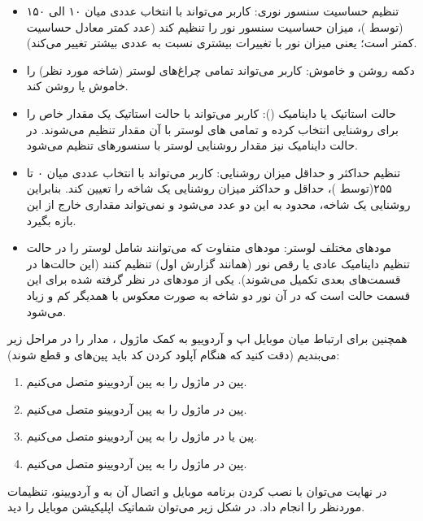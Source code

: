 \documentclass[12pt,a4paper]{article}
\begin{document}
\begin{itemize}
	\item 
{تنظیم حساسیت سنسور نوری:} کاربر می‌تواند با انتخاب عددی میان ۱۰ الی ۱۵۰ (توسط )، میزان حساسیت سنسور نور را تنظیم کند (عدد کمتر معادل حساسیت کمتر است؛ یعنی میزان نور با تغییرات بیشتری نسبت به عددی بیشتر تغییر می‌کند).
	\item 
{دکمه روشن و خاموش:} کاربر می‌تواند تمامی چراغ‌های لوستر (شاخه مورد نظر) را خاموش یا روشن کند.
	\item 
{حالت استاتیک یا داینامیک ():} کاربر می‌تواند با حالت استاتیک یک مقدار خاص را برای روشنایی انتخاب کرده و تمامی  های لوستر با آن مقدار تنظیم می‌شوند. در حالت داینامیک نیز مقدار روشنایی لوستر با سنسورهای تنظیم می‌شود.
	\item 
{تنظیم حداکثر و حداقل میزان روشنایی:} کاربر می‌تواند با انتخاب عددی میان ۰ تا ۲۵۵(توسط )، حداقل و حداکثر میزان روشنایی یک شاخه را تعیین کند. بنابراین روشنایی یک شاخه، محدود به این دو عدد می‌شود و نمی‌تواند مقداری خارج از این بازه بگیرد.
	\item 
{مودهای مختلف لوستر:} مودهای متفاوت که می‌توانند شامل لوستر را در حالت تنظیم داینامیک عادی یا رقص نور (همانند گزارش اول) تنظیم کنند (این حالت‌ها در قسمت‌های بعدی تکمیل می‌شوند). یکی از مودهای در نظر گرفته شده برای این قسمت حالت  است که در آن نور دو شاخه به صورت معکوس با همدیگر کم و زیاد می‌شود.

\end{itemize}
همچنین برای ارتباط میان موبایل اپ و آردوییو به کمک ماژول ، مدار را در مراحل زیر می‌بندیم (دقت کنید که هنگام آپلود کردن کد باید پین‌های  و  قطع شوند):
\begin{enumerate}
	\item
	پین  در ماژول  را به پین  آردویینو متصل می‌کنیم.
	\item
	پین  در ماژول  را به پین  آردویینو متصل می‌کنیم.
	\item
	پین  یا  در ماژول  را به پین  آردویینو متصل می‌کنیم.
	\item
	پین  در ماژول  را به پین  آردویینو متصل می‌کنیم.
\end{enumerate}

در نهایت می‌توان با نصب کردن برنامه موبایل و اتصال آن به  و آردویینو، تنظیمات موردنظر را انجام داد.
\newpage
در شکل زیر می‌توان شماتیک اپلیکیشن موبایل را دید.
\end{document}
